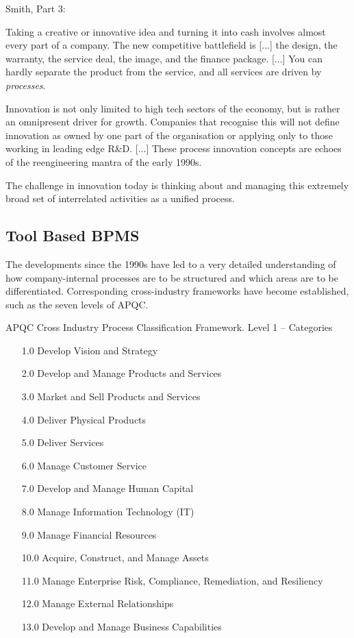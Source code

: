 \documentclass[11pt,a4paper]{article}
\begin{document}
Smith, Part 3:

Taking a creative or innovative idea and turning it into cash involves almost
every part of a company. The new competitive battlefield is [...] the design,
the warranty, the service deal, the image, and the finance package.  [...] You
can hardly separate the product from the service, and all services are driven
by \emph{processes}.
  
Innovation is not only limited to high tech sectors of the economy, but is
rather an omnipresent driver for growth. Companies that recognise this will
not define innovation as owned by one part of the organisation or applying
only to those working in leading edge R\&D.  [...] These process innovation
concepts are echoes of the reengineering mantra of the early 1990s.

The challenge in innovation today is thinking about and managing this
extremely broad set of interrelated activities as a unified process.

\subsection{Tool Based BPMS}

The developments since the 1990s have led to a very detailed understanding of
how company-internal processes are to be structured and which areas are to be
differentiated.  Corresponding cross-industry frameworks have become
established, such as the seven levels of APQC.

APQC Cross Industry Process Classification Framework. Level 1 -- Categories
\cite{APQC-1,APQC-2,APQC-3}
\begin{itemize}
\item[1.0] Develop Vision and Strategy
\item[2.0] Develop and Manage Products and Services
\item[3.0] Market and Sell Products and Services 
\item[4.0] Deliver Physical Products 
\item[5.0] Deliver Services 
\item[6.0] Manage Customer Service 
\item[7.0] Develop and Manage Human Capital 
\item[8.0] Manage Information Technology (IT) 
\item[9.0] Manage Financial Resources 
\item[10.0] Acquire, Construct, and Manage Assets 
\item[11.0] Manage Enterprise Risk, Compliance, Remediation, and Resiliency 
\item[12.0] Manage External Relationships 
\item[13.0] Develop and Manage Business Capabilities
\end{itemize}
\end{document}
